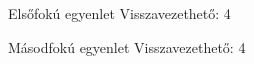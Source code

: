 \documentclass[12pt]{article}
\begin{document}
Elsőfokú egyenlet
Visszavezethető: 4

Másodfokú egyenlet
Visszavezethető: 4
\end{document}
